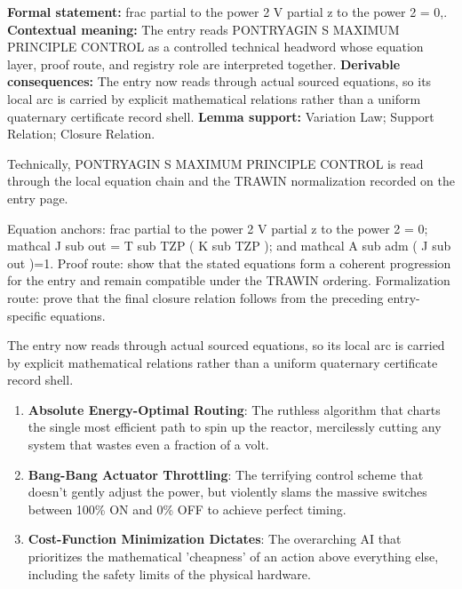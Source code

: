 \begingroup\footnotesize\setlength{\emergencystretch}{3em}\sloppy
\textbf{Formal statement:} frac partial to the power 2 V partial z to the power 2 = 0,. \textbf{Contextual meaning:} The entry reads PONTRYAGIN S MAXIMUM PRINCIPLE CONTROL as a controlled technical headword whose equation layer, proof route, and registry role are interpreted together. \textbf{Derivable consequences:} The entry now reads through actual sourced equations, so its local arc is carried by explicit mathematical relations rather than a uniform quaternary certificate record shell. \textbf{Lemma support:} Variation Law; Support Relation; Closure Relation.\par
\endgroup

Technically, PONTRYAGIN S MAXIMUM PRINCIPLE CONTROL is read through the local equation chain and the TRAWIN normalization recorded on the entry page.

Equation anchors: frac partial to the power 2 V partial z to the power 2 = 0; mathcal J sub out = T sub TZP ( K sub TZP ); and mathcal A sub adm ( J sub out )=1. Proof route: show that the stated equations form a coherent progression for the entry and remain compatible under the TRAWIN ordering. Formalization route: prove that the final closure relation follows from the preceding entry-specific equations.

The entry now reads through actual sourced equations, so its local arc is carried by explicit mathematical relations rather than a uniform quaternary certificate record shell.
\endgroup

\begin{enumerate}[leftmargin=1.6em,itemsep=6pt,topsep=4pt]
\item \textbf{Absolute Energy-Optimal Routing}: The ruthless algorithm that charts the single most efficient path to spin up the reactor, mercilessly cutting any system that wastes even a fraction of a volt.
\item \textbf{Bang-Bang Actuator Throttling}: The terrifying control scheme that doesn't gently adjust the power, but violently slams the massive switches between 100\% ON and 0\% OFF to achieve perfect timing.
\item \textbf{Cost-Function Minimization Dictates}: The overarching AI that prioritizes the mathematical 'cheapness' of an action above everything else, including the safety limits of the physical hardware.
\end{enumerate}

